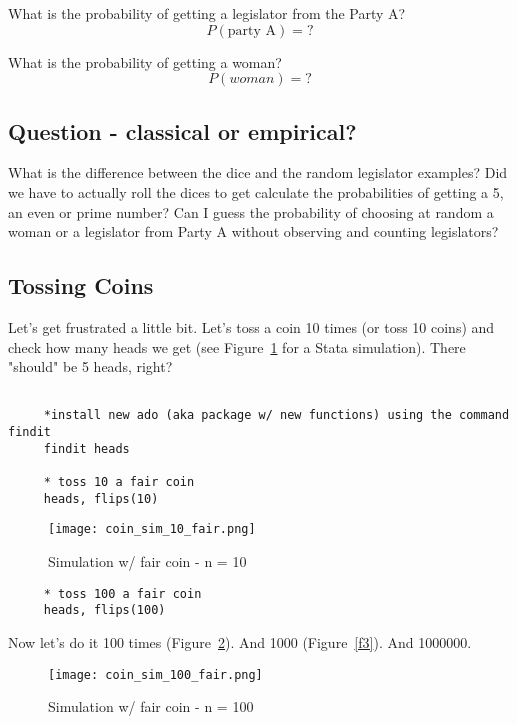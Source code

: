 \documentclass[11pt]{article}
\begin{document}
	What is the probability of getting a legislator from the Party A?
	\[P(\text{party A}) = ?\]
	
	What is the probability of getting a woman?
	\[P(woman) = ?\]

	\subsection*{Question - classical or empirical?}

	What is the difference between the dice and the random legislator examples? Did we have to actually roll the dices to get calculate the probabilities of getting a 5, an even or prime number? Can I guess the probability of choosing at random a woman or a legislator from Party A without observing and counting legislators?\\

	\subsection*{Tossing Coins}

	Let's get frustrated a little bit. Let's toss a coin 10 times (or toss 10 coins) and check how many heads we get (see Figure~\ref{f1} for a Stata simulation). There "should" be 5 heads, right?\\


		\begin{verbatim}

	 *install new ado (aka package w/ new functions) using the command findit
	 findit heads

	 * toss 10 a fair coin
	 heads, flips(10)
	\end{verbatim}


\begin{figure}[htp]
\centering
\texttt{[image: coin\_sim\_10\_fair.png]}
\caption{Simulation w/ fair coin - n = 10}
\label{f1}
\end{figure}

	\begin{verbatim}
	 * toss 100 a fair coin
	 heads, flips(100)
	\end{verbatim}

	Now let's do it 100 times (Figure~\ref{f2}). And 1000 (Figure~\ref{f3}). And 1000000.\\

\begin{figure}[htp]
\centering
\texttt{[image: coin\_sim\_100\_fair.png]}
\caption{Simulation w/ fair coin - n = 100}
\label{f2}
\end{figure}
	 
\end{document}
